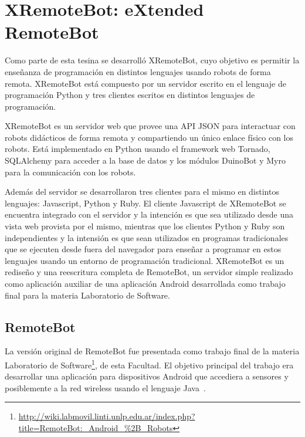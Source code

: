 \chapter{XRemoteBot: eXtended RemoteBot}\label{cha:xremotebot}

Como parte de esta tesina se desarrolló XRemoteBot, cuyo objetivo
es permitir la enseñanza de programación en distintos lenguajes usando
robots de forma remota. XRemoteBot está compuesto por un servidor
escrito en el lenguaje de programación Python y tres clientes escritos
en distintos lenguajes de programación.


XRemoteBot es un servidor web que provee una API JSON para interactuar
con robots didácticos de forma remota y compartiendo un único enlace
físico con los robots. Está implementado en Python usando el
framework web Tornado, SQLAlchemy para acceder a la base de datos
y los módulos DuinoBot y Myro para
la comunicación con los robots.

Además del servidor se desarrollaron tres clientes para el mismo en distintos
lenguajes: Javascript, Python y Ruby. El cliente Javascript de XRemoteBot
se encuentra
integrado con el servidor y la intención es que sea utilizado desde una
vista web provista por el mismo, mientras que los clientes Python y Ruby
son independientes y la intensión es que sean utilizados en programas
tradicionales que se ejecuten desde fuera del navegador para enseñar
a programar en estos lenguajes usando un entorno de programación
tradicional. XRemoteBot
es un rediseño y una reescritura completa de RemoteBot, un servidor
simple realizado como aplicación auxiliar de una aplicación Android
desarrollada
como trabajo final para la materia Laboratorio de Software.

\section{RemoteBot}\label{sec:remotebot}

La versión original de RemoteBot fue presentada como trabajo final
de la materia Laboratorio de
Software\footnote{\url{http://wiki.labmovil.linti.unlp.edu.ar/index.php?title=RemoteBot:_Android_\%2B_Robots}},
de esta Facultad.
El objetivo principal del trabajo era desarrollar una aplicación para
dispositivos Android que accediera a sensores y posiblemente a la red
wireless usando el lenguaje Java~\citep{queiruga_2013}.

